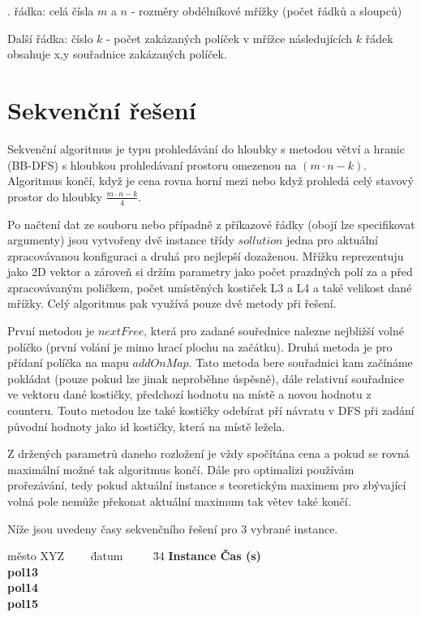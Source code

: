 \documentclass[]{article}
\begin{document}
. řádka: celá čísla $m$ a $n$ - rozměry obdélníkové mřížky (počet řádků a sloupců)

\noindent
Další řádka: číslo $k$ - počet zakázaných políček v mřížce
následujících $k$ řádek obsahuje x,y souřadnice zakázaných políček.

\section{Sekvenční řešení}
Sekvenční algoritmus je typu prohledávání do hloubky s metodou větví a hranic (BB-DFS) s hloubkou prohle\-dávaní prostoru omezenou na $(m \cdot n-k)$.
Algoritmus končí, když je cena rovna horní mezi nebo když prohledá celý stavový prostor do hloubky $\frac{m \cdot n-k}{4}
$.

Po načtení dat ze souboru nebo případně z příkazové řádky (obojí lze specifikovat argumenty) jsou vytvořeny dvě instance třídy $sollution$ jedna pro aktuální zpracovávanou konfiguraci a druhá pro nejlepší dozaženou. Mřížku reprezentuju jako 2D vektor a zároveň si držím parametry jako počet prazdných polí za a před zpracovávaným poličkem, počet umístěných kostiček L3 a L4 a také velikost dané mřížky. Celý algoritmus pak využívá pouze dvě metody při řešení. 

První metodou je $nextFree$, která pro zadané souřednice nalezne nejbližší volné políčko (první volání je mimo hrací plochu na začátku). Druhá metoda je pro přídaní políčka na mapu $addOnMap$. Tato metoda bere souřadnici kam začínáme pokládat (pouze pokud lze jinak neproběhne úspěsně), dále relativní souřadnice ve vektoru dané kostičky, předchozí hodnotu na místě a novou hodnotu z counteru. Touto metodou lze také kostičky odebírat pří návratu v DFS při zadání původní hodnoty jako id kostičky, která na místě ležela. 

Z držených parametrů daneho rozložení je vždy spočítána cena a pokud se rovná maximální možné tak algoritmus končí. Dále pro optimalizi používám prořezávání, tedy pokud aktuální instance s teoretickým maximem pro zbývající volná pole nemůže překonat aktuální maximum tak větev také končí.

Níže jsou uvedeny časy sekvenčního řešení pro 3 vybrané instance.

\begin{center}
\parbox{0cm}{\begin{tabbing}
 město XYZ ~~~~\= datum ~~~~
    \= 34 \kill
    \bfseries Instance \>
    \bfseries Čas (s) \>
    \\[2mm]
    pol13  \>  \\
    pol14  \> \\
    pol15  \> 
\end{tabbing}}
\end{center}
\end{document}
